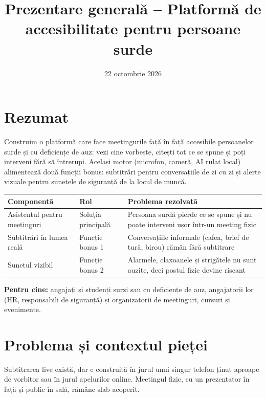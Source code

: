 \documentclass[11pt,a4paper]{article}
\title{\textbf{Prezentare generală -- Platformă de accesibilitate pentru persoane surde}}
\author{}
\date{22 octombrie 2026}
\begin{document}
\maketitle
\vspace{-1.5em}

\section*{Rezumat}

Construim o platformă care face meetingurile față în față accesibile persoanelor surde și cu deficiențe de auz: vezi cine vorbește, citești tot ce se spune și poți interveni fără să întrerupi. Același motor (microfon, cameră, AI rulat local) alimentează două funcții bonus: subtitrări pentru conversațiile de zi cu zi și alerte vizuale pentru sunetele de siguranță de la locul de muncă.

\begin{center}
\begin{tabularx}{\textwidth}{>{\raggedright\arraybackslash}p{4.2cm} >{\raggedright\arraybackslash}p{3cm} L}
\toprule
\textbf{Componentă} & \textbf{Rol} & \textbf{Problema rezolvată} \\
\midrule
Asistentul pentru meetinguri & Soluția principală & Persoana surdă pierde ce se spune și nu poate interveni ușor într-un meeting fizic \\
Subtitrări în lumea reală & Funcție bonus 1 & Conversațiile informale (cafea, brief de tură, birou) rămân fără subtitrare \\
Sunetul vizibil & Funcție bonus 2 & Alarmele, claxoanele și strigătele nu sunt auzite, deci postul fizic devine riscant \\
\bottomrule
\end{tabularx}
\end{center}

\textbf{Pentru cine:} angajați și studenți surzi sau cu deficiențe de auz, angajatorii lor (HR, responsabili de siguranță) și organizatorii de meetinguri, cursuri și evenimente.

\section*{Problema și contextul pieței}

Subtitrarea live există, dar e construită în jurul unui singur telefon ținut aproape de vorbitor sau în jurul apelurilor online. Meetingul fizic, cu un prezentator în față și public în sală, rămâne slab acoperit.
\end{document}
